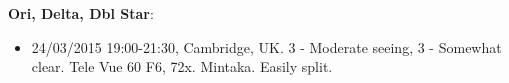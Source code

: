{\bf Ori, Delta, Dbl Star}:
\begin{itemize}
\item 24/03/2015 19:00-21:30, Cambridge, UK. 3 - Moderate seeing, 3 - Somewhat clear. Tele Vue 60 F6, 72x. Mintaka. Easily split. 
\end{itemize}

